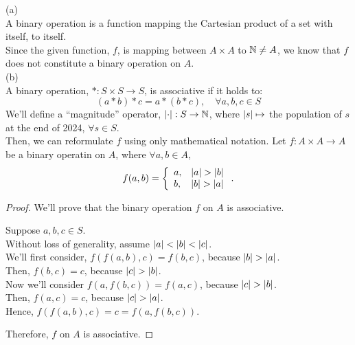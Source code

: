 \documentclass[a4paper,12pt]{report}
\begin{document}
\newpage
{}
\sol (a) \\
A binary operation is a function mapping the Cartesian product of a set with itself, to itself. \\
Since the given function, $f$, is mapping between $A\times A$ to $\mathbb{N}\neq A$, we know that $f$ does not constitute a binary operation on $A$. \\

\sol (b) \\
A binary operation, $*:S\times S\to S$, is associative if it holds to:
$$
	(a*b)*c = a*(b*c),\quad \forall a,b,c\in S
$$
We'll define a ``magnitude'' operator, $\left| \cdot \right|:S\to\mathbb{N}$, where $\left| s \right|\mapsto$ the population of $s$ at the end of 2024, $\forall s\in S$. \\
Then, we can reformulate $f$ using only mathematical notation. Let $f:A\times A\to A$ be a binary operatin on $A$, where $\forall a,b\in A$,
$$
	f(a,b) = \left\lbrace\begin{array}{ll} a, & \abs{a}>\abs{b} \\ b, & \abs{b} > \abs{a}	\end{array} \right. .
$$

\begin{proof}
	We'll prove that the binary operation $f$ on $A$ is associative.

\begin{list}{}{\setlength{\leftmargin}{1in}\setlength{\topsep}{0pt}}\item 
	Suppose $a,b,c\in S$. \\
	Without loss of generality, assume $\left| a \right| < \left| b \right| < \left| c \right|$. \\
	We'll first consider, $f(f(a,b),c) = f(b,c)$, because $\abs{b}>\abs{a}$. \\
	Then, $f(b,c) = c$, because $\abs{c}>\abs{b}$. \\
	Now we'll consider $f(a,f(b,c)) = f(a,c)$, because $\abs{c}>\abs{b}$. \\
	Then, $f(a,c) = c$, because $\abs{c}>\abs{a}$. \\
	Hence, $f(f(a,b),c) = c = f(a,f(b,c))$.
\end{list}
	Therefore, $f$ on $A$ is associative.
\end{proof}
\end{document}
